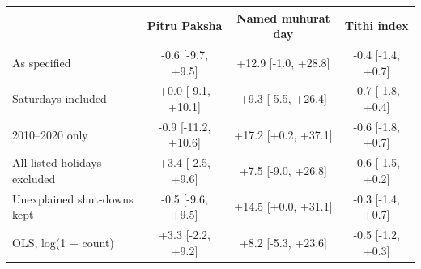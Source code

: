 \begin{tabular}{lccc}
\toprule
 & Pitru Paksha & Named muhurat day & Tithi index \\
\midrule
As specified & -0.6 [-9.7, +9.5] & +12.9 [-1.0, +28.8] & -0.4 [-1.4, +0.7] \\
Saturdays included & +0.0 [-9.1, +10.1] & +9.3 [-5.5, +26.4] & -0.7 [-1.8, +0.4] \\
2010--2020 only & -0.9 [-11.2, +10.6] & +17.2 [+0.2, +37.1] & -0.6 [-1.8, +0.7] \\
All listed holidays excluded & +3.4 [-2.5, +9.6] & +7.5 [-9.0, +26.8] & -0.6 [-1.5, +0.2] \\
Unexplained shut-downs kept & -0.5 [-9.6, +9.5] & +14.5 [+0.0, +31.1] & -0.3 [-1.4, +0.7] \\
OLS, log(1 + count) & +3.3 [-2.2, +9.2] & +8.2 [-5.3, +23.6] & -0.5 [-1.2, +0.3] \\
\bottomrule
\end{tabular}
